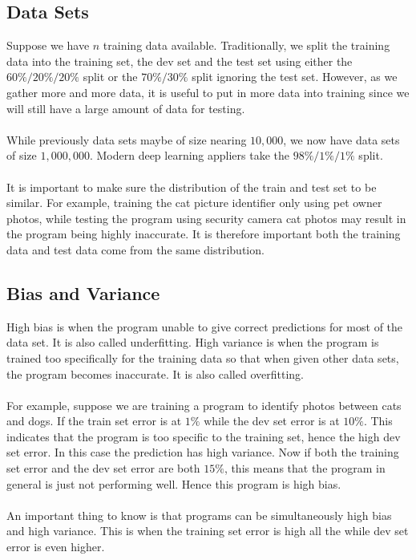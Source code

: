 \documentclass[a4paper]{article}
\begin{document}
\subsection{Data Sets}
Suppose we have $n$ training data available. Traditionally, we split the training data into the training set, the dev set and the test set using either the $60\%/20\%/20\%$ split or the $70\%/30\%$ split ignoring the test set. However, as we gather more and more data, it is useful to put in more data into training since we will still have a large amount of data for testing. \\~\\
While previously data sets maybe of size nearing $10,000$, we now have data sets of size $1,000,000$. Modern deep learning appliers take the $98\%/1\%/1\%$ split. \\~\\
It is important to make sure the distribution of the train and test set to be similar. For example, training the cat picture identifier only using pet owner photos, while testing the program using security camera cat photos may result in the program being highly inaccurate. It is therefore important both the training data and test data come from the same distribution. 

\subsection{Bias and Variance}
High bias is when the program unable to give correct predictions for most of the data set. It is also called underfitting. High variance is when the program is trained too specifically for the training data so that when given other data sets, the program becomes inaccurate. It is also called overfitting. \\~\\

For example, suppose we are training a program to identify photos between cats and dogs. If the train set error is at $1\%$ while the dev set error is at $10\%$. This indicates that the program is too specific to the training set, hence the high dev set error. In this case the prediction has high variance. Now if both the training set error and the dev set error are both $15\%$, this means that the program in general is just not performing well. Hence this program is high bias. \\~\\

An important thing to know is that programs can be simultaneously high bias and high variance. This is when the training set error is high all the while dev set error is even higher. \\~\\
\end{document}
